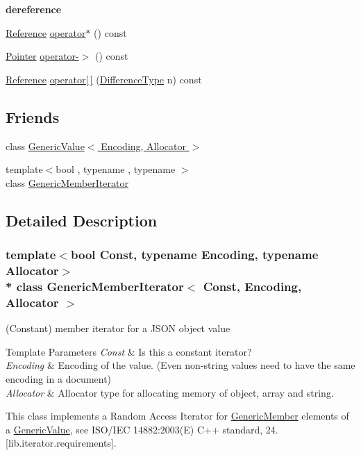 \begin{Indent}{\bf dereference}\par
\begin{DoxyCompactItemize}
\item 
\hyperlink{classGenericMemberIterator_ae80f6b601eb9e24f73aa75fb32b35c65}{Reference} \hyperlink{classGenericMemberIterator_a37f5cb3b669682da70fe3e5ec6bc4775}{operator$\ast$} () const 
\item 
\hyperlink{classGenericMemberIterator_ac69f141f1fde31c1f550f524a69c5de9}{Pointer} \hyperlink{classGenericMemberIterator_a2e3d0e0f9a5c0ca69f09e4927ed985c3}{operator-\/$>$} () const 
\item 
\hyperlink{classGenericMemberIterator_ae80f6b601eb9e24f73aa75fb32b35c65}{Reference} \hyperlink{classGenericMemberIterator_ae83095869e033554257e3f33df59fcfb}{operator\mbox{[}$\,$\mbox{]}} (\hyperlink{classGenericMemberIterator_a902b99c8ae351cd7626514dc5f30740a}{Difference\+Type} n) const 
\end{DoxyCompactItemize}
\end{Indent}
\subsection*{Friends}
\begin{DoxyCompactItemize}
\item 
class \hyperlink{classGenericMemberIterator_a82bdd5798f1a5ac0e3e7ba4bd6938cfc}{Generic\+Value$<$ Encoding, Allocator $>$}
\item 
{\footnotesize template$<$bool , typename , typename $>$ }\\class \hyperlink{classGenericMemberIterator_aa375aeb1ffac85cddc3a72a6c24ec6e1}{Generic\+Member\+Iterator}
\end{DoxyCompactItemize}


\subsection{Detailed Description}
\subsubsection*{template$<$bool Const, typename Encoding, typename Allocator$>$\\*
class Generic\+Member\+Iterator$<$ Const, Encoding, Allocator $>$}

(Constant) member iterator for a J\+S\+ON object value 


\begin{DoxyTemplParams}{Template Parameters}
{\em Const} & Is this a constant iterator? \\
\hline
{\em Encoding} & Encoding of the value. (Even non-\/string values need to have the same encoding in a document) \\
\hline
{\em Allocator} & Allocator type for allocating memory of object, array and string.\\
\hline
\end{DoxyTemplParams}
This class implements a Random Access Iterator for \hyperlink{structGenericMember}{Generic\+Member} elements of a \hyperlink{classGenericValue}{Generic\+Value}, see I\+S\+O/\+I\+EC 14882\+:2003(E) C++ standard, 24. \mbox{[}lib.\+iterator.\+requirements\mbox{]}.

